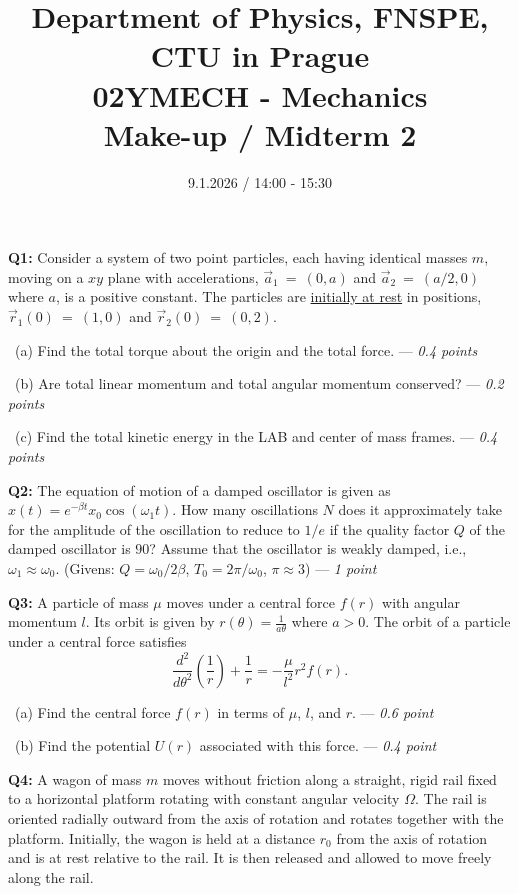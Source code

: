 \documentclass[a4paper,12pt]{article}
\title{{\large Department of Physics, FNSPE, CTU in Prague} \\
                  02YMECH - Mechanics \\ 
          {\Large \textbf{Make-up / Midterm 2}}\vspace{-1cm}}
\date{9.1.2026 / 14:00 - 15:30}
\author{}
\begin{document}
\maketitle

\textbf{Q1:} Consider a system of two point particles, each having identical masses $m$, moving on a $xy$ plane with accelerations, $\vec a_{1}~=~(0,a)$ and $\vec a_{2}~=~(a/2,0)$ where $a$, is a positive constant. The particles are \underline{initially at rest} in positions, $\vec r_{1}(0)~=~(1,0)$ and $\vec r_{2}(0)~=~(0,2)$.

\vspace*{0.1cm}
~(a) Find the total torque about the origin and the total force. --- \textit{0.4 points}

~(b) Are total linear momentum and total angular momentum conserved? --- \textit{0.2 points}

~(c) Find the total kinetic energy in the LAB and center of mass frames. --- \textit{0.4 points}

\vspace*{0.25cm}
\textbf{Q2:} The equation of motion of a damped oscillator is given as $x(t)=e^{-\beta t}x_0\cos{\left(\omega_1 t\right)}$. How many oscillations $N$ does it approximately take for the amplitude of the oscillation to reduce to $1/e$ if the quality factor $Q$ of the damped oscillator is $90$? Assume that the oscillator is weakly damped, i.e., $\omega_1 \approx \omega_0$.
(Givens: $Q = \omega_0/2\beta$, $T_0=2\pi/\omega_0$, $\pi\approx 3$) --- \textit{1 point}

\vspace*{0.25cm}
\textbf{Q3:} A particle of mass $\mu$ moves under a central force $f(r)$ with angular momentum $l$. Its orbit is given by $r(\theta) = \frac{1}{a \theta}$ where $a > 0$. The orbit of a particle under a central force satisfies
\[
\frac{d^2}{d\theta^2}\left(\frac{1}{r}\right) + \frac{1}{r} = -\frac{\mu}{l^2} r^2 f(r).
\]

\vspace*{0.1cm}
~(a) Find the central force $f(r)$ in terms of $\mu$, $l$, and $r$. --- \textit{0.6 point}

~(b) Find the potential $U(r)$ associated with this force. --- \textit{0.4 point}

\vspace*{0.25cm}
\textbf{Q4:} A wagon of mass $m$ moves without friction along a straight, rigid rail fixed to a horizontal platform rotating with constant angular velocity $\Omega$.  
The rail is oriented radially outward from the axis of rotation and rotates together with the platform. Initially, the wagon is held at a distance $r_0$ from the axis of rotation and is at rest relative to the rail. It is then released and allowed to move freely along the rail.
\end{document}
